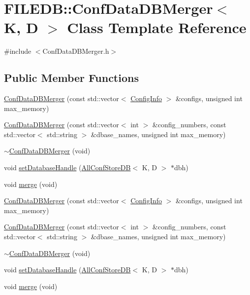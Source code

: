 \hypertarget{classFILEDB_1_1ConfDataDBMerger}{}\section{F\+I\+L\+E\+DB\+:\+:Conf\+Data\+D\+B\+Merger$<$ K, D $>$ Class Template Reference}
\label{classFILEDB_1_1ConfDataDBMerger}


{\ttfamily \#include $<$Conf\+Data\+D\+B\+Merger.\+h$>$}

\subsection*{Public Member Functions}
\begin{DoxyCompactItemize}
\item 
\mbox{\hyperlink{classFILEDB_1_1ConfDataDBMerger_a2d22aeb10cb29cd9acb42cbd042c74d3}{Conf\+Data\+D\+B\+Merger}} (const std\+::vector$<$ \mbox{\hyperlink{classFILEDB_1_1ConfigInfo}{Config\+Info}} $>$ \&configs, unsigned int max\+\_\+memory)
\item 
\mbox{\hyperlink{classFILEDB_1_1ConfDataDBMerger_a495cdfd447f2ed64776d87601c36a05b}{Conf\+Data\+D\+B\+Merger}} (const std\+::vector$<$ int $>$ \&config\+\_\+numbers, const std\+::vector$<$ std\+::string $>$ \&dbase\+\_\+names, unsigned int max\+\_\+memory)
\item 
\mbox{\hyperlink{classFILEDB_1_1ConfDataDBMerger_a1592d55d089ad7ead813ab8d2b955e09}{$\sim$\+Conf\+Data\+D\+B\+Merger}} (void)
\item 
void \mbox{\hyperlink{classFILEDB_1_1ConfDataDBMerger_aba7a50569bcdc1beca3b82536fa5922b}{set\+Database\+Handle}} (\mbox{\hyperlink{classFILEDB_1_1AllConfStoreDB}{All\+Conf\+Store\+DB}}$<$ K, D $>$ $\ast$dbh)
\item 
void \mbox{\hyperlink{classFILEDB_1_1ConfDataDBMerger_a6738f9880645518ba94eccd3b2037f24}{merge}} (void)
\item 
\mbox{\hyperlink{classFILEDB_1_1ConfDataDBMerger_a2d22aeb10cb29cd9acb42cbd042c74d3}{Conf\+Data\+D\+B\+Merger}} (const std\+::vector$<$ \mbox{\hyperlink{classFILEDB_1_1ConfigInfo}{Config\+Info}} $>$ \&configs, unsigned int max\+\_\+memory)
\item 
\mbox{\hyperlink{classFILEDB_1_1ConfDataDBMerger_a495cdfd447f2ed64776d87601c36a05b}{Conf\+Data\+D\+B\+Merger}} (const std\+::vector$<$ int $>$ \&config\+\_\+numbers, const std\+::vector$<$ std\+::string $>$ \&dbase\+\_\+names, unsigned int max\+\_\+memory)
\item 
\mbox{\hyperlink{classFILEDB_1_1ConfDataDBMerger_a1592d55d089ad7ead813ab8d2b955e09}{$\sim$\+Conf\+Data\+D\+B\+Merger}} (void)
\item 
void \mbox{\hyperlink{classFILEDB_1_1ConfDataDBMerger_aba7a50569bcdc1beca3b82536fa5922b}{set\+Database\+Handle}} (\mbox{\hyperlink{classFILEDB_1_1AllConfStoreDB}{All\+Conf\+Store\+DB}}$<$ K, D $>$ $\ast$dbh)
\item 
void \mbox{\hyperlink{classFILEDB_1_1ConfDataDBMerger_a6738f9880645518ba94eccd3b2037f24}{merge}} (void)
\end{DoxyCompactItemize}


